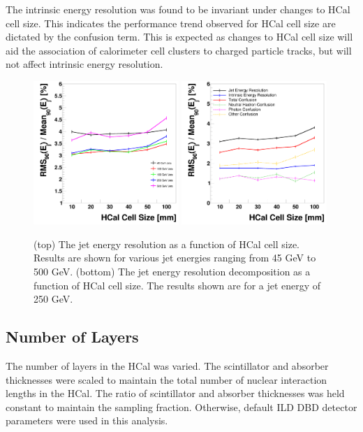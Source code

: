 \documentclass[final,3p,times,twocolumn]{elsarticle}
\begin{document}
The intrinsic energy resolution was found to be invariant under changes to HCal cell size.  This indicates the performance trend observed for HCal cell size are dictated by the confusion term.  This is expected as changes to HCal cell size will aid the association of calorimeter cell clusters to charged particle tracks, but will not affect intrinsic energy resolution.

\begin{figure}[!h]
  \begin{center}
     \includegraphics[width=0.49\textwidth]{JERvsHCalCellSizeHCalTC10ns.png}
     \includegraphics[width=0.49\textwidth]{JERBreakdownvsHCalCellSize500GeVDiJetHCalTC10ns.png}
     \caption{ (top) The jet energy resolution as a function of HCal cell size.  Results are shown for various jet energies ranging from 45 GeV to 500 GeV.  (bottom) The jet energy resolution decomposition as a function of HCal cell size.  The results shown are for a jet energy of 250 GeV.  \label{HCalCellSize}}
  \end{center}
\end{figure}

\subsection{Number of Layers}
The number of layers in the HCal was varied.  The scintillator and absorber thicknesses were scaled to maintain the total number of nuclear interaction lengths in the HCal.  The ratio of scintillator and absorber thicknesses was held constant to maintain the sampling fraction.  Otherwise, default ILD DBD detector parameters were used in this analysis.
\end{document}
